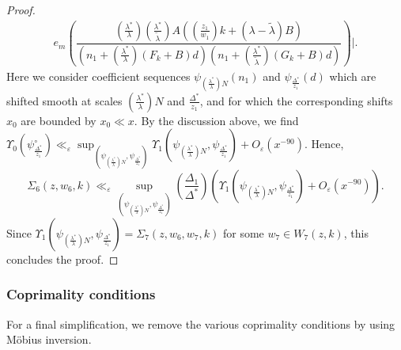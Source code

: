 \documentclass{amsart}
\numberwithin{equation}{section}
\begin{document}
\begin{proof}
\begin{align*}
e_{m}\!\!\left(\dfrac{(\frac{\lambda^*}{\lambda})(\frac{\lambda^*}{\widetilde{\lambda}})A ((\frac{z_1}{w_1}) k   +  (\lambda-\widetilde{\lambda})B)}{(n_1 + (\frac{\lambda^*}{\lambda}) (F_k +B )d)( n_1 + ( \frac{\lambda^*}{\widetilde{\lambda}})(G_k+B) d)}\right)\Bigg|. 
\end{align*}
Here we consider  coefficient sequences $\psi_{(\frac{\lambda^*}{\lambda})N}(n_1)$  and $\psi_{\frac{\Delta^*}{z_1}}(d)$ which are shifted smooth at scales $(\frac{\lambda^*}{\lambda})N$ and $\frac{\Delta^*}{z_1}$, and for which the corresponding shifts $x_0$ are bounded by $x_0 \ll x$. By the discussion above, we find
$ \Upsilon_0(\psi^\circ_{\frac{\Delta^*}{z_1}}) \ll_\varepsilon
\sup_{(\psi_{(\frac{\lambda^*}{\lambda})N},\psi_{\frac{\Delta^*}{z_1}})}\Upsilon_1(\psi_{(\frac{\lambda^*}{\lambda})N},\psi_{\frac{\Delta^*}{z_1}}) + O_\varepsilon(x^{-90})
$. Hence, 
$$ \Sigma_6(z,w_6,k)\ll_\varepsilon  \sup_{(\psi_{(\frac{\lambda^*}{\lambda})N},\psi_{\frac{\Delta^*}{z_1}})}\left(\frac{\Delta_1}{\Delta^*}\right)(\Upsilon_1(\psi_{(\frac{\lambda^*}{\lambda})N},\psi_{\frac{\Delta^*}{z_1}}) + O_\varepsilon(x^{-90})).  $$
 Since $\Upsilon_1(\psi_{(\frac{\lambda^*}{\lambda})N},\psi_{\frac{\Delta^*}{z_1}}) = \Sigma_7(z,w_6,w_7,k)$ for some $w_7 \in W_7(z,k)$, this concludes the proof.
\end{proof}

\subsubsection{Coprimality conditions}  For a final simplification, we remove the various coprimality conditions by using Möbius inversion.
  
\end{document}

